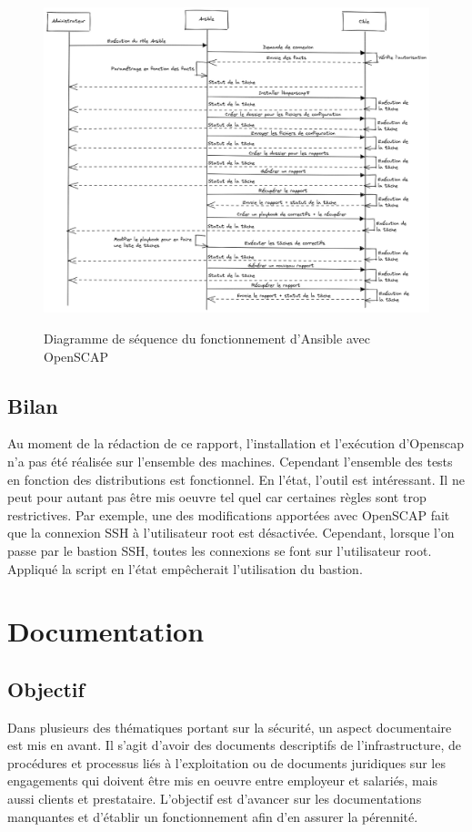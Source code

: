 \documentclass[12pt]{article}
\begin{document}
\begin{figure}[!ht]
    \centering
    \includegraphics[width=\textwidth]{src/graph_ansible_oscap.png}
    \label{fig:ansible_oscap}
    \caption{Diagramme de séquence du fonctionnement d'\gls{Ansible} avec OpenSCAP}
\end{figure}

\newpage
\subsection{Bilan}
Au moment de la rédaction de ce rapport, l'installation et l'exécution d'Openscap n'a pas été réalisée sur l'ensemble des machines. 
Cependant l'ensemble des tests en fonction des distributions est fonctionnel.
En l'état, l'outil est intéressant. 
Il ne peut pour autant pas être mis oeuvre tel quel car certaines règles sont trop restrictives.
Par exemple, une des modifications apportées avec \gls{OpenSCAP} fait que la connexion SSH à l'utilisateur root est désactivée.
Cependant, lorsque l'on passe par le bastion SSH, toutes les connexions se font sur l'utilisateur root.
Appliqué la script en l'état empêcherait l'utilisation du bastion.

\newpage
\section{Documentation}
\subsection{Objectif}
Dans plusieurs des thématiques portant sur la sécurité, un aspect documentaire est mis en avant. 
Il s'agit d'avoir des documents descriptifs de l'infrastructure, de procédures et processus liés à l'exploitation ou de documents juridiques sur les engagements qui doivent être mis en oeuvre entre employeur et salariés, mais aussi clients et prestataire. 
L'objectif est d'avancer sur les documentations manquantes et d'établir un fonctionnement afin d'en assurer la pérennité.
\end{document}
